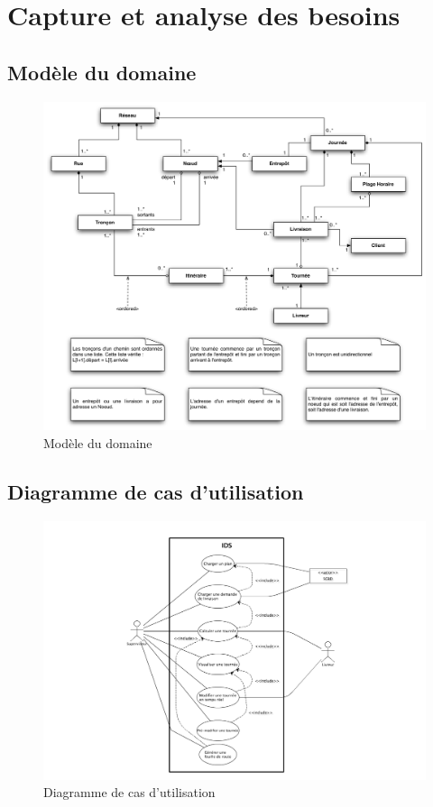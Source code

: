 \chapter{Capture et analyse des besoins}

\section{Mod\`ele du domaine}

\begin{figure}[h]
    \centering
    \includegraphics[width=140mm]{../diagrams/domain_model/domaine.png}
    \caption{Mod\`ele du domaine}
    \label{diagram:domaine}
\end{figure}

\section{Diagramme de cas d’utilisation}

\begin{figure}[h]
    \centering
    \includegraphics[width=140mm]{../diagrams/use_case/use_case_diagram.png}
    \caption{Diagramme de cas d’utilisation}
    \label{diagram:use_case}
\end{figure}
